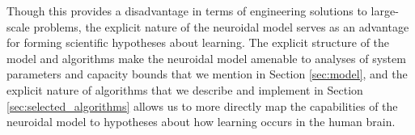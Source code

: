 \documentclass[letterpaper, 12pt]{article}
\begin{document}
Though this provides a disadvantage in terms of engineering solutions to large-scale problems, the explicit nature of the neuroidal model serves as an advantage for forming scientific hypotheses about learning. The explicit structure of the model and algorithms make the neuroidal model amenable to analyses of system parameters and capacity bounds that we mention in Section \ref{sec:model}, and the explicit nature of algorithms that we describe and implement in Section \ref{sec:selected_algorithms} allows us to more directly map the capabilities of the neuroidal model to hypotheses about how learning occurs in the human brain.



\end{document}
